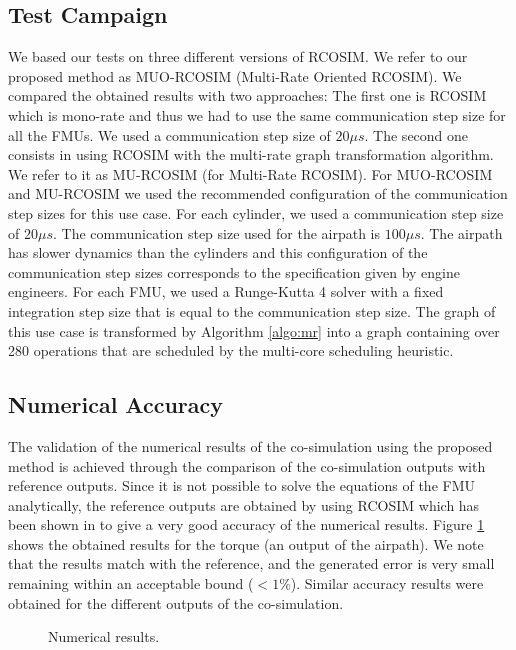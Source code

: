 \subsection{Test Campaign}

We based our tests on three different versions of RCOSIM. We refer to our proposed method as MUO-RCOSIM (Multi-Rate Oriented RCOSIM). We compared the obtained results with two approaches: The first one is RCOSIM which is mono-rate and thus we had to use the same communication step size for all the FMUs. We used a communication step size of $20 {\mu}s$. The second one consists in using RCOSIM with the multi-rate graph transformation algorithm. We refer to it as MU-RCOSIM (for Multi-Rate RCOSIM). For MUO-RCOSIM and MU-RCOSIM we used the recommended configuration of the communication step sizes for this use case. For each cylinder, we used a communication step size of $20 {\mu}s$. The communication step size used for the airpath is $100 {\mu}s$. The airpath has slower dynamics than the cylinders and this configuration of the communication step sizes corresponds to the specification given by engine engineers. For each FMU, we used a Runge-Kutta 4 solver with a fixed integration step size that is equal to the communication step size. The graph of this use case is transformed by Algorithm \ref{algo:mr} into a graph containing over 280 operations that are scheduled by the multi-core scheduling heuristic.      

\subsection{Numerical Accuracy}

The validation of the numerical results of the co-simulation using the proposed method is achieved through the comparison of the co-simulation outputs with reference outputs. Since it is not possible to solve the equations of the FMU analytically, the reference outputs are obtained by using RCOSIM which has been shown in \cite{benkhaled:2014} to give a very good accuracy of the numerical results. Figure \ref{fig:df} shows the obtained results for the torque (an output of the airpath). We note that the results match with the reference, and the generated error is very small remaining within an acceptable bound ($< 1\%$). Similar accuracy results were obtained for the different outputs of the co-simulation.

\begin{figure}[phbt]
\centering

\caption{Numerical results.}
\label{fig:df}
\end{figure}

